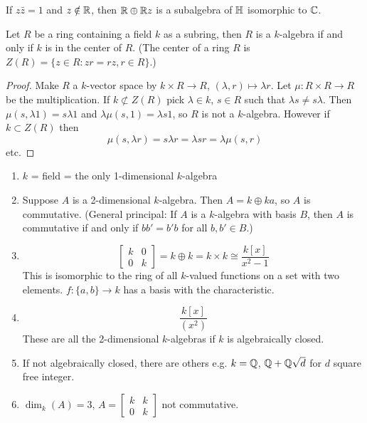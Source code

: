   If $z\bar{z} = 1$ and $z \notin \mathbb{R}$, then $\mathbb{R} \oplus \mathbb{R} z$ is a subalgebra of
  $\mathbb{H}$ isomorphic to $\mathbb{C}$.

  \begin{lemma}
    Let $R$ be a ring containing a field $k$ as a subring, then $R$ is a
    $k$-algebra if and only if $k$ is in the center of $R$. (The center of a
    ring $R$ is $Z(R) = \{z\in R: zr=rz, r \in R\}$.)
  \end{lemma}
  \begin{proof}
    Make $R$ a $k$-vector space by $k\times R \to R$,
    $(\lambda,r) \mapsto \lambda r$. Let $\mu: R \times R \to R$ be the
    multiplication. If $k \not\subset Z(R)$ pick $\lambda \in k$, $s\in R$ such
    that $\lambda s \neq s\lambda$. Then $\mu(s,\lambda 1) = s \lambda 1$ and
    $\lambda\mu(s,1) = \lambda s 1$, so $R$ is not a $k$-algebra. However if
    $k \subset Z(R)$ then 
    \[\mu(s,\lambda r) = s\lambda r = \lambda sr = \lambda\mu(s,r)\]
    etc.
  \end{proof}

  \begin{enumerate}
    \item $k$ = field = the only 1-dimensional $k$-algebra
    \item Suppose $A$ is a 2-dimensional $k$-algebra. Then $A = k\oplus ka$,
      so $A$ is commutative. (General principal: If $A$ is a $k$-algebra with
      basis $B$, then $A$ is commutative if and only if $bb' = b'b$ for all
      $b,b' \in B$.)
    \item \[\begin{bmatrix} k & 0 \\ 0 & k \end{bmatrix} = k\oplus k
      = k\times k \cong \frac{k[x]}{x^2-1}\]
      This is isomorphic to the ring of all $k$-valued functions on a set with
      two elements. $f:\{a,b\} \to k$ has a basis with the characteristic.
    \item \[\frac{k[x]}{(x^2)}\]
      These are all the 2-dimensional $k$-algebras if $k$ is algebraically
      closed.
    \item If not algebraically closed, there are others e.g. $k = \mathbb{Q}$,
      $\mathbb{Q} + \mathbb{Q}\sqrt{d}$ for $d$ square free integer.
    \item $\dim_k(A) = 3$, $A = \begin{bmatrix} k & k \\ 0 & k\end{bmatrix}$
      not commutative.
  \end{enumerate}

